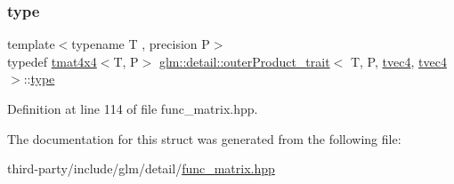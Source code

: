 \subsubsection{\texorpdfstring{type}{type}}
{\footnotesize\ttfamily template$<$typename T , precision P$>$ \\
typedef \hyperlink{structglm_1_1detail_1_1tmat4x4}{tmat4x4}$<$T, P$>$ \hyperlink{structglm_1_1detail_1_1outer_product__trait}{glm\+::detail\+::outer\+Product\+\_\+trait}$<$ T, P, \hyperlink{structglm_1_1detail_1_1tvec4}{tvec4}, \hyperlink{structglm_1_1detail_1_1tvec4}{tvec4} $>$\+::\hyperlink{structglm_1_1detail_1_1outer_product__trait_3_01_t_00_01_p_00_01tvec4_00_01tvec4_01_4_a89f0d2b33be6604293d1373176291811}{type}}



Definition at line 114 of file func\+\_\+matrix.\+hpp.



The documentation for this struct was generated from the following file\+:\begin{DoxyCompactItemize}
\item 
third-\/party/include/glm/detail/\hyperlink{func__matrix_8hpp}{func\+\_\+matrix.\+hpp}\end{DoxyCompactItemize}
